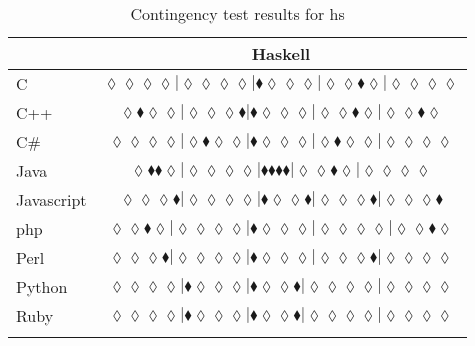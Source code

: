 \begin{table*}
\centering
\begin{tabular}{l c}
& Haskell \\
\hline

C & $\scriptscriptstyle\lozenge\lozenge\lozenge\lozenge|\lozenge\lozenge\lozenge\lozenge|\blacklozenge\lozenge\lozenge\lozenge|\lozenge\lozenge\blacklozenge\lozenge|\lozenge\lozenge\lozenge\lozenge$ \\
C++ & $\scriptscriptstyle\lozenge\blacklozenge\lozenge\lozenge|\lozenge\lozenge\lozenge\blacklozenge|\blacklozenge\lozenge\lozenge\lozenge|\lozenge\lozenge\blacklozenge\lozenge|\lozenge\lozenge\blacklozenge\lozenge$ \\
C\# & $\scriptscriptstyle\lozenge\lozenge\lozenge\lozenge|\lozenge\blacklozenge\lozenge\lozenge|\blacklozenge\lozenge\lozenge\lozenge|\lozenge\blacklozenge\lozenge\lozenge|\lozenge\lozenge\lozenge\lozenge$ \\
Java & $\scriptscriptstyle\lozenge\blacklozenge\blacklozenge\lozenge|\lozenge\lozenge\lozenge\lozenge|\blacklozenge\blacklozenge\blacklozenge\blacklozenge|\lozenge\lozenge\blacklozenge\lozenge|\lozenge\lozenge\lozenge\lozenge$ \\
Javascript & $\scriptscriptstyle\lozenge\lozenge\lozenge\blacklozenge|\lozenge\lozenge\lozenge\lozenge|\blacklozenge\lozenge\lozenge\blacklozenge|\lozenge\lozenge\lozenge\blacklozenge|\lozenge\lozenge\lozenge\blacklozenge$ \\
{\sc php} & $\scriptscriptstyle\lozenge\lozenge\blacklozenge\lozenge|\lozenge\lozenge\lozenge\lozenge|\blacklozenge\lozenge\lozenge\lozenge|\lozenge\lozenge\lozenge\lozenge|\lozenge\lozenge\blacklozenge\lozenge$ \\
Perl & $\scriptscriptstyle\lozenge\lozenge\lozenge\blacklozenge|\lozenge\lozenge\lozenge\lozenge|\blacklozenge\lozenge\lozenge\lozenge|\lozenge\lozenge\lozenge\blacklozenge|\lozenge\lozenge\lozenge\lozenge$ \\
Python & $\scriptscriptstyle\lozenge\lozenge\lozenge\lozenge|\blacklozenge\lozenge\lozenge\lozenge|\blacklozenge\lozenge\lozenge\blacklozenge|\lozenge\lozenge\lozenge\lozenge|\lozenge\lozenge\lozenge\lozenge$ \\
Ruby & $\scriptscriptstyle\lozenge\lozenge\lozenge\lozenge|\blacklozenge\lozenge\lozenge\lozenge|\blacklozenge\lozenge\lozenge\blacklozenge|\lozenge\lozenge\lozenge\lozenge|\lozenge\lozenge\lozenge\lozenge$ \\

\hline
& \\
\end{tabular}
\caption{Contingency test results for hs}
\label{tbl:contingency-test-results-hs}
\end{table*}


